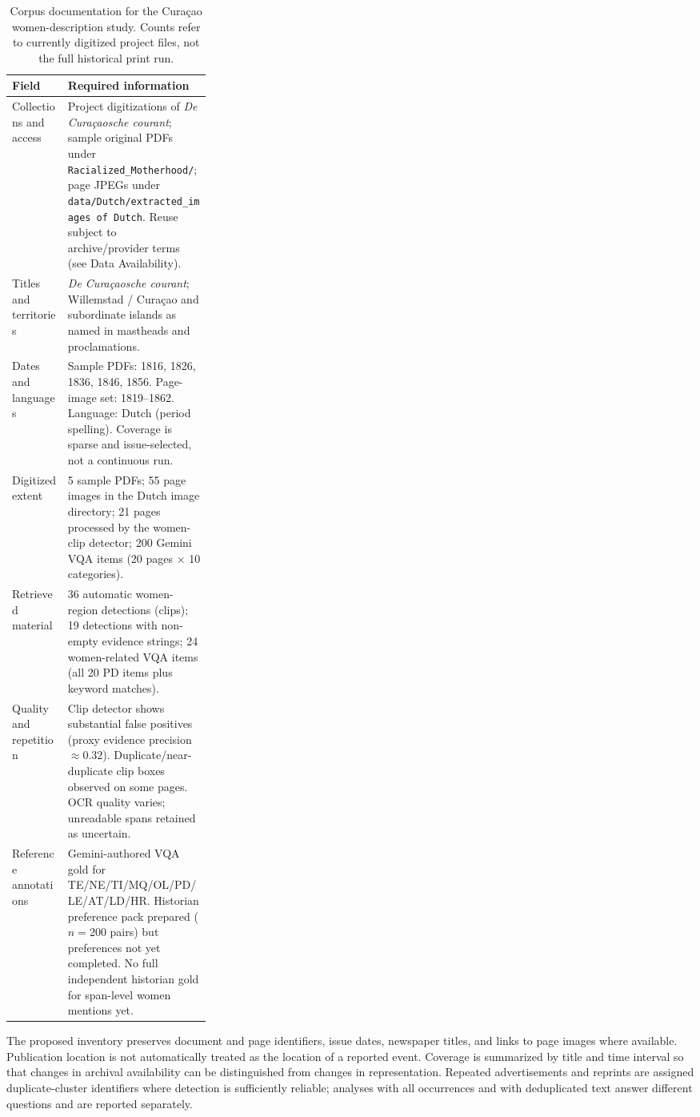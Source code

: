 \documentclass[sigconf]{acmart}
\begin{document}
\begin{table}[tbp]
\centering
\caption{Corpus documentation for the Cura\c{c}ao women-description study. Counts refer to currently digitized project files, not the full historical print run.}
\label{tab:corpus}
\small
\begin{tabularx}{\linewidth}{@{}p{0.29\linewidth}Y@{}}
\toprule
\textbf{Field} & \textbf{Required information} \\
\midrule
Collections and access & Project digitizations of \textit{De Cura\c{c}aosche courant}; sample original PDFs under \texttt{Racialized\_Motherhood/}; page JPEGs under \texttt{data/Dutch/extracted\_images of Dutch}. Reuse subject to archive/provider terms (see Data Availability). \\
Titles and territories & \textit{De Cura\c{c}aosche courant}; Willemstad / Cura\c{c}ao and subordinate islands as named in mastheads and proclamations. \\
Dates and languages & Sample PDFs: 1816, 1826, 1836, 1846, 1856. Page-image set: 1819--1862. Language: Dutch (period spelling). Coverage is sparse and issue-selected, not a continuous run. \\
Digitized extent & 5 sample PDFs; 55 page images in the Dutch image directory; 21 pages processed by the women-clip detector; 200 Gemini VQA items (20 pages $\times$ 10 categories). \\
Retrieved material & 36 automatic women-region detections (clips); 19 detections with non-empty evidence strings; 24 women-related VQA items (all 20 PD items plus keyword matches). \\
Quality and repetition & Clip detector shows substantial false positives (proxy evidence precision $\approx 0.32$). Duplicate/near-duplicate clip boxes observed on some pages. OCR quality varies; unreadable spans retained as uncertain. \\
Reference annotations & Gemini-authored VQA gold for TE/NE/TI/MQ/OL/PD/LE/AT/LD/HR. Historian preference pack prepared ($n{=}200$ pairs) but preferences not yet completed. No full independent historian gold for span-level women mentions yet. \\
\bottomrule
\end{tabularx}
\end{table}

The proposed inventory preserves document and page identifiers, issue dates, newspaper titles, and links to page images where available. Publication location is not automatically treated as the location of a reported event. Coverage is summarized by title and time interval so that changes in archival availability can be distinguished from changes in representation. Repeated advertisements and reprints are assigned duplicate-cluster identifiers where detection is sufficiently reliable; analyses with all occurrences and with deduplicated text answer different questions and are reported separately.
\end{document}
